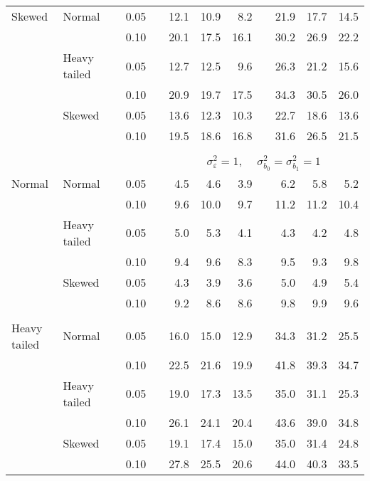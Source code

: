 \begin{table}[ht]
\begin{scriptsize}
\begin{center}
\begin{tabular}{ll p{.1cm} c p{.1cm} rrr p{.1cm} rrr}
Skewed       & Normal       && 0.05 &&   12.1 & 10.9 & 8.2 &   & 21.9 & 17.7 & 14.5 \\ 
             &              && 0.10 &&   20.1 & 17.5 & 16.1 &   & 30.2 & 26.9 & 22.2 \\ 
             & Heavy tailed && 0.05 &&   12.7 & 12.5 & 9.6 &   & 26.3 & 21.2 & 15.6 \\ 
             &              && 0.10 &&   20.9 & 19.7 & 17.5 &   & 34.3 & 30.5 & 26.0 \\ 
             & Skewed       && 0.05 &&   13.6 & 12.3 & 10.3 &   & 22.7 & 18.6 & 13.6 \\ 
             &              && 0.10 &&   19.5 & 18.6 & 16.8 &   & 31.6 & 26.5 & 21.5 \\ 

&&&&&&&&&&&\\
& && && \multicolumn{7}{c}{$\sigma_{\varepsilon}^2 = 1$, \ \ $\sigma_{b_0}^2 = \sigma_{b_1}^2 = 1$} \\ \cline{6-12}
\rowcolor{gray!20}Normal       & Normal       && 0.05 &&   4.5 & 4.6 & 3.9 &   & 6.2 & 5.8 & 5.2 \\ 
\rowcolor{gray!20}             &              && 0.10 &&   9.6 & 10.0 & 9.7 &   & 11.2 & 11.2 & 10.4 \\ 
\rowcolor{gray!20}             & Heavy tailed && 0.05 &&   5.0 & 5.3 & 4.1 &   & 4.3 & 4.2 & 4.8 \\ 
\rowcolor{gray!20}             &              && 0.10 &&   9.4 & 9.6 & 8.3 &   & 9.5 & 9.3 & 9.8 \\ 
\rowcolor{gray!20}             & Skewed       && 0.05 &&   4.3 & 3.9 & 3.6 &   & 5.0 & 4.9 & 5.4 \\ 
\rowcolor{gray!20}             &              && 0.10 &&   9.2 & 8.6 & 8.6 &   & 9.8 & 9.9 & 9.6 \\ 
&&&&&&&&&&&\\
Heavy tailed & Normal       && 0.05 &&   16.0 & 15.0 & 12.9 &   & 34.3 & 31.2 & 25.5 \\ 
             &              && 0.10 &&   22.5 & 21.6 & 19.9 &   & 41.8 & 39.3 & 34.7 \\ 
             & Heavy tailed && 0.05 &&   19.0 & 17.3 & 13.5 &   & 35.0 & 31.1 & 25.3 \\ 
             &              && 0.10 &&   26.1 & 24.1 & 20.4 &   & 43.6 & 39.0 & 34.8 \\ 
             & Skewed       && 0.05 &&   19.1 & 17.4 & 15.0 &   & 35.0 & 31.4 & 24.8 \\ 
             &              && 0.10 &&   27.8 & 25.5 & 20.6 &   & 44.0 & 40.3 & 33.5 \\ 

\end{tabular}
\end{center}
\end{scriptsize}
\end{table}
